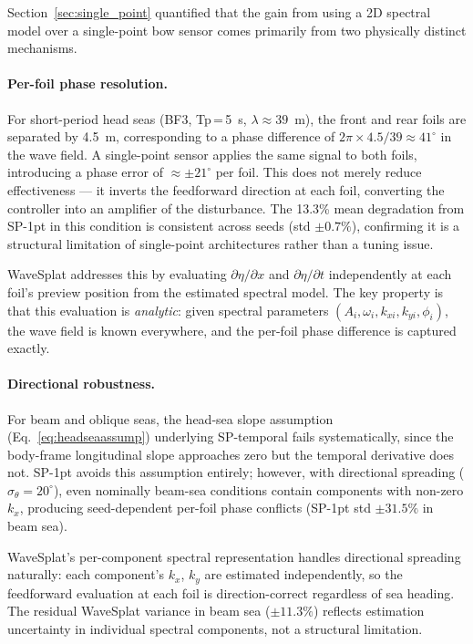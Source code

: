 \documentclass[review]{elsarticle}
\begin{document}
Section~\ref{sec:single_point} quantified that the gain from using a 2D
spectral model over a single-point bow sensor comes primarily from two
physically distinct mechanisms.

\paragraph{Per-foil phase resolution.}
For short-period head seas (BF3, Tp\,=\,5~s, $\lambda \approx 39$~m),
the front and rear foils are separated by 4.5~m, corresponding to a
phase difference of $2\pi \times 4.5/39 \approx 41^\circ$ in the wave
field.  A single-point sensor applies the same signal to both foils,
introducing a phase error of $\approx \pm 21^\circ$ per foil.
This does not merely reduce effectiveness --- it inverts the feedforward
direction at each foil, converting the controller into an amplifier of
the disturbance.  The 13.3\% mean degradation from SP-1pt in this
condition is consistent across seeds (std $\pm 0.7\%$), confirming it
is a structural limitation of single-point architectures rather than a
tuning issue.

WaveSplat addresses this by evaluating $\partial\eta/\partial x$ and
$\partial\eta/\partial t$ independently at each foil's preview position
from the estimated spectral model.  The key property is that this
evaluation is \emph{analytic}: given spectral parameters $(A_i, \omega_i,
k_{xi}, k_{yi}, \phi_i)$, the wave field is known everywhere, and the
per-foil phase difference is captured exactly.

\paragraph{Directional robustness.}
For beam and oblique seas, the head-sea slope assumption
(Eq.~\ref{eq:headseaassump}) underlying SP-temporal fails systematically,
since the body-frame longitudinal slope approaches zero but the temporal
derivative does not.  SP-1pt avoids this assumption entirely; however,
with directional spreading ($\sigma_\theta = 20^\circ$), even nominally
beam-sea conditions contain components with non-zero $k_x$, producing
seed-dependent per-foil phase conflicts (SP-1pt std $\pm 31.5\%$ in beam
sea).

WaveSplat's per-component spectral representation handles directional
spreading naturally: each component's $k_x$, $k_y$ are estimated
independently, so the feedforward evaluation at each foil is direction-correct
regardless of sea heading.  The residual WaveSplat variance in beam sea
($\pm 11.3\%$) reflects estimation uncertainty in individual spectral
components, not a structural limitation.
\end{document}
